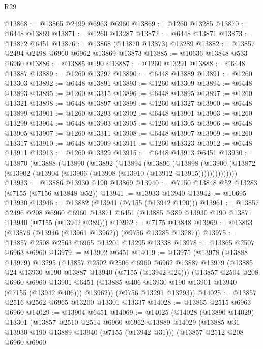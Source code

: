 \begin{lexlean}{R29}
\begin{coremodule}
@13868 := @13865 @2499 @6963 @6960
@13869 := @1260 @13285
@13870 := @6448 @13869
@13871 := @1260 @13287
@13872 := @6448 @13871
@13873 := @13872 @6451
@13876 := @13868 (@13870 @13873) @13289
@13882 := @13857 @2494 @2498 @6960 @6962 @13869 @13873
@13885 := @10636 @13848 @533 @6960
@13886 := @13885 @190
@13887 := @1260 @13291
@13888 := @6448 @13887
@13889 := @1260 @13297
@13890 := @6448 @13889
@13891 := @1260 @13303
@13892 := @6448 @13891
@13893 := @1260 @13309
@13894 := @6448 @13893
@13895 := @1260 @13315
@13896 := @6448 @13895
@13897 := @1260 @13321
@13898 := @6448 @13897
@13899 := @1260 @13327
@13900 := @6448 @13899
@13901 := @1260 @13293
@13902 := @6448 @13901
@13903 := @1260 @13299
@13904 := @6448 @13903
@13905 := @1260 @13305
@13906 := @6448 @13905
@13907 := @1260 @13311
@13908 := @6448 @13907
@13909 := @1260 @13317
@13910 := @6448 @13909
@13911 := @1260 @13323
@13912 := @6448 @13911
@13913 := @1260 @13329
@13915 := @6448 @13913 @6451
@13930 := @13870
    (@13888
      (@13890
        (@13892
          (@13894
            (@13896
              (@13898
                (@13900 (@13872 (@13902 (@13904 (@13906 (@13908 (@13910 (@13912 @13915))))))))))))))
@13933 := @13886 @13930 @190 @13869
@13940 := @7150 @13848 @52 @13283 (@7155 (@7156 @13848 @52))
@13941 := @13933 @13940
@13942 := @10695 @13930
@13946 := @13882 (@13941 (@7155 (@13942 @190)))
@13961 := @13857
    @2496
    @208
    @6960
    @6960
    @13871
    @6451
    (@13885 @389 @13930 @190 @13871 @13940 (@7155 (@13942 @389)))
@13962 := @7175 @13848
@13969 := @13863 (@13876 (@13946 (@13961 @13962)) (@9756 @13285 @13287))
@13975 := @13857 @2508 @2563 @6965 @13201 @13295 @13338
@13978 := @13865 @2507 @6963 @6960
@13979 := @13902 @6451
@14019 := @13975
    (@13978
      (@13888 @13979)
      @13295
      (@13857
        @2502
        @2506
        @6960
        @6962
        @13887
        @13979
        (@13885 @24 @13930 @190 @13887 @13940 (@7155 (@13942 @24)))
        (@13857
          @2504
          @208
          @6960
          @6960
          @13901
          @6451
          (@13885 @406 @13930 @190 @13901 @13940 (@7155 (@13942 @406)))
          @13962))
      (@9756 @13291 @13293))
@14025 := @13857 @2516 @2562 @6965 @13200 @13301 @13337
@14028 := @13865 @2515 @6963 @6960
@14029 := @13904 @6451
@14069 := @14025
    (@14028
      (@13890 @14029)
      @13301
      (@13857
        @2510
        @2514
        @6960
        @6962
        @13889
        @14029
        (@13885 @31 @13930 @190 @13889 @13940 (@7155 (@13942 @31)))
        (@13857
          @2512
          @208
          @6960
          @6960

\end{coremodule}
\end{lexlean}
